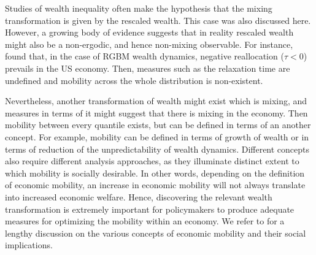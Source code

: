 \documentclass[11pt]{article}
\numberwithin{equation}{section}
\begin{document}
Studies of wealth inequality often make the hypothesis that the mixing transformation is given by the rescaled wealth. This case was also discussed here. However, a growing body of evidence suggests that in reality rescaled wealth might also be a non-ergodic, and hence non-mixing observable. For instance, \citet{BermanPetersAdamou2019} found that, in the case of RGBM wealth dynamics, negative reallocation ($\tau < 0$) prevails in the US economy. Then, measures such as the relaxation time are undefined and mobility across the whole distribution is non-existent.
 
Nevertheless, another transformation of wealth might exist which is mixing, and measures in terms of it might suggest that there is mixing in the economy. Then mobility between every quantile exists, but can be defined in terms of an another concept.  For example, mobility can be defined in terms of growth of wealth or in terms of reduction of the unpredictability of wealth dynamics. Different concepts also require different analysis approaches, as they illuminate distinct extent to which mobility is socially desirable. In other words, depending on the definition of economic mobility, an increase in economic mobility will not always translate into increased economic welfare. Hence, discovering the relevant wealth transformation is extremely important for policymakers to produce adequate measures for optimizing the mobility within an economy. We refer to \citet{JanttiJenkins2015} for a lengthy discussion on the various concepts of economic mobility and their social implications.
\end{document}
